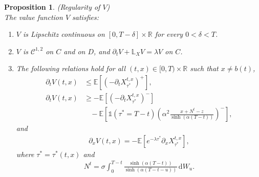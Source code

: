 \documentclass{tufte-handout}
\newcommand{\E}{\mathbb{E}} %
\newcommand{\R}{\mathbb{R}} %
\newtheorem{pr}{Proposition}
\begin{document}
	\begin{pr}(Regularity of $V$)\label{pr:V_regularity}\\
		The value function $V$ satisfies:
		\begin{enumerate}[label=(\roman{*}), ref=(\textit{\roman{*}})]
			\item \label{pr:V_Lcontinuous} $V$ is Lipschitz continuous on $[0, T - \delta]\times\R$ for every $0 < \delta < T$. 
			\item \label{pr:V_C^12onC} $V$ is $\mathcal{C}^{1,2}$ on $C$ and on $D$, and $\partial_tV + \mathbb{L}_{X}V = \lambda V$ on $C$. 
			\item \label{pr:V_x-V_t} The following relations hold for all $(t, x) \in [0, T)\times\R$ such that $x\neq b(t)$,
			\begin{align}
			\partial_t V(t, x) &\leq \E\left[\left(-\partial_t X_{\tau^*}^{t, x}\right)^+\right], \label{eq:Vt_up} \\		
			\partial_t V(t, x) &\geq - \E\left[\left(-\partial_t X_{\tau^*}^{t, x}\right)^-\right] \nonumber \\
			&\ \ \ \ - \E\left[\mathbb{1}(\tau^* = T - t)\left(\alpha^2\frac{x + N^t - z}{\sinh(\alpha (T - t))}\right)^-\right], \label{eq:Vt_low}
			\end{align}
			and
			\begin{align}\label{eq:V_x}
			\partial_xV(t, x) = -\E\left[e^{-\lambda\tau^*}\partial_x X_{\tau^*}^{t, x}\right],
			\end{align} 
			where $\tau^* = \tau^*(t, x)$ and
			\begin{align}\label{eq:N^t}
			N^t = \sigma\int_{0}^{T - t} \frac{\sinh(\alpha (T - t))}{\sinh(\alpha (T - t - u))}\,\mathrm{d}W_u. 
			\end{align} 			
		\end{enumerate}
	\end{pr}
	
\end{document}
